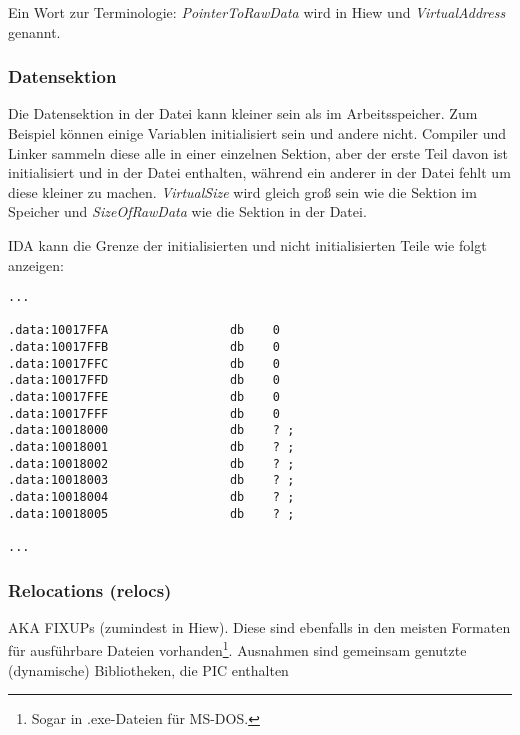 Ein Wort zur Terminologie: \emph{PointerToRawData} wird in Hiew 
und \emph{VirtualAddress}  genannt.

\subsubsection{Datensektion}
Die Datensektion in der Datei kann kleiner sein als im Arbeitsspeicher. Zum
Beispiel können einige Variablen initialisiert sein und andere nicht.
Compiler und Linker sammeln diese alle in einer einzelnen Sektion, aber
der erste Teil davon ist initialisiert und in der Datei enthalten, während
ein anderer in der Datei fehlt um diese kleiner zu machen.
\emph{VirtualSize} wird gleich groß sein wie die Sektion im Speicher und
\emph{SizeOfRawData} wie die Sektion in der Datei.

IDA kann die Grenze der initialisierten und nicht initialisierten Teile
wie folgt anzeigen:

\begin{lstlisting}
...

.data:10017FFA                 db    0
.data:10017FFB                 db    0
.data:10017FFC                 db    0
.data:10017FFD                 db    0
.data:10017FFE                 db    0
.data:10017FFF                 db    0
.data:10018000                 db    ? ;
.data:10018001                 db    ? ;
.data:10018002                 db    ? ;
.data:10018003                 db    ? ;
.data:10018004                 db    ? ;
.data:10018005                 db    ? ;

...
\end{lstlisting}




\subsubsection{Relocations (relocs)}
\label{subsec:relocs}

\ac{AKA} FIXUPs (zumindest in Hiew).
Diese sind ebenfalls in den meisten Formaten für ausführbare Dateien
vorhanden\footnote{Sogar in .exe-Dateien für MS-DOS.}.
Ausnahmen sind gemeinsam genutzte (dynamische) Bibliotheken, die \ac{PIC} enthalten

